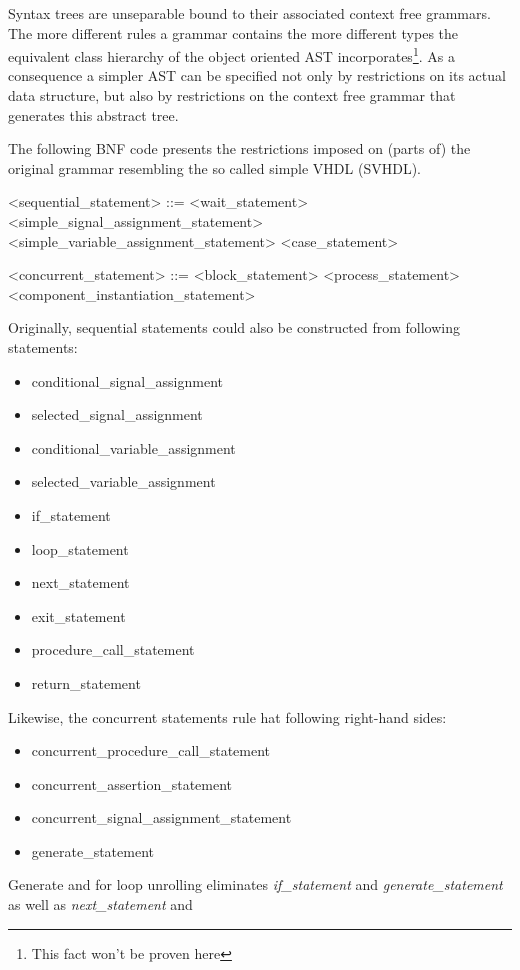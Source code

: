 Syntax trees are unseparable bound to their associated
context free grammars. The more different rules a grammar contains the
more different types the equivalent class hierarchy of the object
oriented AST incorporates\footnote{This fact won't be proven here}. As
a consequence a simpler AST can be specified not only by restrictions
on its actual data structure, but also by restrictions on the context free
grammar that generates this abstract tree.

The following BNF code presents the restrictions imposed on (parts of)
the original grammar resembling the so called simple VHDL (SVHDL).
%
\begin{grammar}
<sequential_statement> ::=
    <wait_statement> \alt
    <simple_signal_assignment_statement> \alt
    <simple_variable_assignment_statement> \alt
    <case_statement>

<concurrent_statement> ::=
    <block_statement> \alt
    <process_statement> \alt
    <component_instantiation_statement>
\end{grammar}
%
Originally, sequential statements could also be constructed from
following statements:
%
\begin{itemize}
    \item conditional_signal_assignment
    \item selected_signal_assignment
    \item conditional_variable_assignment
    \item selected_variable_assignment
    \item if_statement
    \item loop_statement
    \item next_statement
    \item exit_statement
    \item procedure_call_statement
    \item return_statement
\end{itemize}
%
Likewise, the concurrent statements rule hat following right-hand
sides:
%
\begin{itemize}
    \item concurrent_procedure_call_statement
    \item concurrent_assertion_statement
    \item concurrent_signal_assignment_statement
    \item generate_statement
\end{itemize}
%
Generate and for loop unrolling eliminates \emph{if_statement} and
\emph{generate_statement} as well as \emph{next_statement} and
